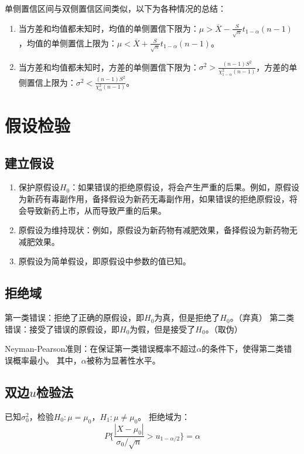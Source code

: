 \documentclass[a4paper,12pt]{ctexart}
\begin{document}
单侧置信区间与双侧置信区间类似，以下为各种情况的总结：
\begin{enumerate}
	\item 当方差和均值都未知时，均值的单侧置信下限为：$\mu > \overline{X} - \frac{S}{\sqrt{n}}t_{1-\alpha}(n-1)$，均值的单侧置信上限为：$\mu < \overline{X} + \frac{S}{\sqrt{n}}t_{1-\alpha}(n-1)$。
	\item 当方差和均值都未知时，方差的单侧置信下限为：$\sigma^2 > \frac{(n-1)S^2}{\chi_{1-\alpha}^2(n-1)}$，方差的单侧置信上限为：$\sigma^2 < \frac{(n-1)S^2}{\chi_{\alpha}^2(n-1)}$。
\end{enumerate}

\section{假设检验}

\subsection*{建立假设}

\begin{enumerate}
	\item 保护原假设$H_0$：如果错误的拒绝原假设，将会产生严重的后果。例如，原假设为新药有毒副作用，备择假设为新药无毒副作用，如果错误的拒绝原假设，将会导致新药上市，从而导致严重的后果。
	\item 原假设为维持现状：例如，原假设为新药物有减肥效果，备择假设为新药物无减肥效果。
	\item 原假设为简单假设，即原假设中参数的值已知。
\end{enumerate}

\subsection{拒绝域}

第一类错误：拒绝了正确的原假设，即$H_0$为真，但是拒绝了$H_0$。（弃真）
第二类错误：接受了错误的原假设，即$H_0$为假，但是接受了$H_0$。（取伪）

Neyman-Pearson准则：在保证第一类错误概率不超过$\alpha$的条件下，使得第二类错误概率最小。
其中，$\alpha$被称为显著性水平。

\subsection{双边$u$检验法}

已知$\sigma_0^2$，检验$H_0: \mu = \mu_0$，$H_1: \mu \neq \mu_0$。
拒绝域为：
\begin{equation*}
	P\{\frac{|X - \mu_0|}{\sigma_0 / \sqrt{n}} > u_{1-\alpha/2}\} = \alpha
\end{equation*}
\end{document}
